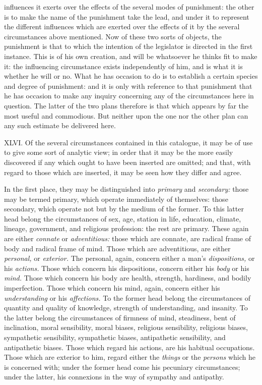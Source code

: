 \documentclass[12pt]{report}
\begin{document}
influences it exerts over the effects of the several modes of
punishment: the other is to make the name of the punishment take the
lead, and under it to represent the different influences which are
exerted over the effects of it by the several circumstances above
mentioned. Now of these two sorts of objects, the punishment is that to
which the intention of the legislator is directed in the first instance.
This is of his own creation, and will be whatsoever he thinks fit to
make it: the influencing circumstance exists independently of him, and
is what it is whether he will or no. What he has occasion to do is to
establish a certain species and degree of punishment: and it is only
with reference to that punishment that he has occasion to make any
inquiry concerning any of the circumstances here in question. The latter
of the two plans therefore is that which appears by far the most useful
and commodious. But neither upon the one nor the other plan can any such
estimate be delivered here.

XLVI. Of the several circumstances contained in this catalogue, it may
be of use to give some sort of analytic view; in order that it may be
the more easily discovered if any which ought to have been inserted are
omitted; and that, with regard to those which are inserted, it may be
seen how they differ and agree.

In the first place, they may be distinguished into \emph{primary} and
\emph{secondary:} those may be termed primary, which operate immediately
of themselves: those secondary, which operate not but by the medium of
the former. To this latter head belong the circumstances of sex, age,
station in life, education, climate, lineage, government, and religious
profession: the rest are primary. These again are either \emph{connate}
or \emph{adventitious:} those which are connate, are radical frame of
body and radical frame of mind. Those which are adventitious, are either
\emph{personal,} or \emph{exterior.} The personal, again, concern either
a man's \emph{dispositions,} or his \emph{actions.} Those which concern
his dispositions, concern either his \emph{body} or his \emph{mind.}
Those which concern his body are health, strength, hardiness, and bodily
imperfection. Those which concern his mind, again, concern either his
\emph{understanding} or his \emph{affections.} To the former head belong
the circumstances of quantity and quality of knowledge, strength of
understanding, and insanity. To the latter belong the circumstances of
firmness of mind, steadiness, bent of inclination, moral sensibility,
moral biases, religious sensibility, religious biases, sympathetic
sensibility, sympathetic biases, antipathetic sensibility, and
antipathetic biases. Those which regard his actions, are his habitual
occupations. Those which are exterior to him, regard either the
\emph{things} or the \emph{persons} which he is concerned with; under
the former head come his pecuniary circumstances; under the latter, his
connexions in the way of sympathy and antipathy.
\end{document}
